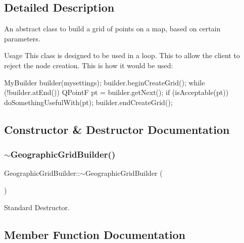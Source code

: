 \subsection{Detailed Description}
An abstract class to build a grid of points on a map, based on certain parameters. 

Usage This class is designed to be used in a loop. This to allow the client to reject the node creation. This is how it would be used\+:

\begin{DoxyVerb}MyBuilder builder(mysettings);
builder.beginCreateGrid();
while (!builder.atEnd()) {
 QPointF pt = builder.getNext();
 if (isAcceptable(pt)) {
   doSomethingUsefulWith(pt);
 }
}
builder.endCreateGrid();
\end{DoxyVerb}
 

\subsection{Constructor \& Destructor Documentation}
\mbox{\label{classdisplace_1_1graphbuilders_1_1_geographic_grid_builder_a9cdee6c4c58c6a748326da5536df34a9}} 
\subsubsection{\texorpdfstring{$\sim$GeographicGridBuilder()}{~GeographicGridBuilder()}}
{\footnotesize\ttfamily Geographic\+Grid\+Builder\+::$\sim$\+Geographic\+Grid\+Builder (\begin{DoxyParamCaption}{ }\end{DoxyParamCaption})\hspace{0.3cm}{\ttfamily [virtual]}}



Standard Destructor. 



\subsection{Member Function Documentation}
\mbox{\label{classdisplace_1_1graphbuilders_1_1_geographic_grid_builder_abf20b262ee44a64508458483d26f42c1}} 
